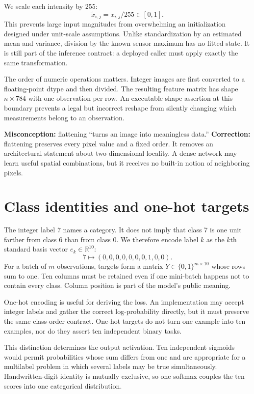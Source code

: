 We scale each intensity by 255:
\[
  \widetilde x_{i,j}=x_{i,j}/255\in[0,1].
\]
This prevents large input magnitudes from overwhelming an initialization
designed under unit-scale assumptions. Unlike standardization by an estimated
mean and variance, division by the known sensor maximum has no fitted state.
It is still part of the inference contract: a deployed caller must apply
exactly the same transformation.

The order of numeric operations matters. Integer images are first converted to
a floating-point dtype and then divided. The resulting feature matrix has
shape $n\times784$ with one observation per row. An executable shape assertion
at this boundary prevents a legal but incorrect reshape from silently changing
which measurements belong to an observation.

\begin{misconceptionbox}
\textbf{Misconception:} flattening ``turns an image into meaningless data.''
\textbf{Correction:} flattening preserves every pixel value and a fixed order.
It removes an architectural statement about two-dimensional locality. A dense
network may learn useful spatial combinations, but it receives no built-in
notion of neighboring pixels.
\end{misconceptionbox}

\section{Class identities and one-hot targets}

The integer label $7$ names a category. It does not imply that class 7 is one
unit farther from class 6 than from class 0. We therefore encode label $k$ as
the $k$th standard basis vector $e_k\in\mathbb R^{10}$:
\[
  7\longmapsto
  (0,0,0,0,0,0,0,1,0,0).
\]
For a batch of $m$ observations, targets form a matrix
$Y\in\{0,1\}^{m\times10}$ whose rows sum to one. Ten columns must be retained
even if one mini-batch happens not to contain every class. Column position is
part of the model's public meaning.

One-hot encoding is useful for deriving the loss. An implementation may accept
integer labels and gather the correct log-probability directly, but it must
preserve the same class-order contract. One-hot targets do not turn one example
into ten examples, nor do they assert ten independent binary tasks.

This distinction determines the output activation. Ten independent sigmoids
would permit probabilities whose sum differs from one and are appropriate for
a multilabel problem in which several labels may be true simultaneously.
Handwritten-digit identity is mutually exclusive, so one softmax couples the
ten scores into one categorical distribution.


